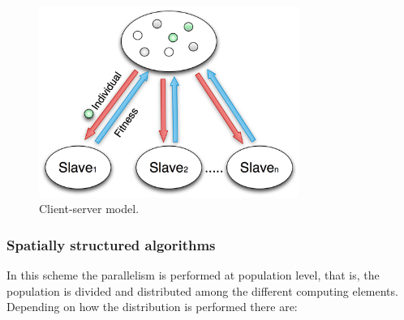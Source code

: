 \documentclass{article}
\begin{document}
\begin{figure}[tb]
\centering
\includegraphics[width=20pc]{serverClient}
\caption{Client-server model.}
\label{fig:serverClient}
\end{figure}

\subsubsection{Spatially structured algorithms}
In this scheme the parallelism is performed at population level, that is, the population is divided and distributed among the different computing elements. Depending on how the distribution is performed there are:
\end{document}

